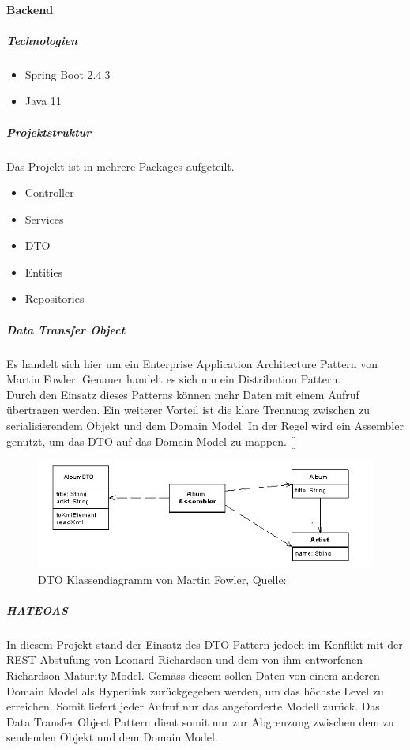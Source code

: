 \paragraph{Backend}
\subparagraph{Technologien}
\begin{itemize}
	\item Spring Boot 2.4.3
	\item Java 11
\end{itemize}
\subparagraph{Projektstruktur}
Das Projekt ist in mehrere Packages aufgeteilt. 
\begin{itemize}
	\item Controller
	\item Services
	\item DTO
	\item Entities
	\item Repositories
\end{itemize}
\subparagraph{Data Transfer Object}\label{DTO}
Es handelt sich hier um ein Enterprise Application Architecture Pattern von Martin Fowler. Genauer handelt es sich um ein Distribution Pattern. \\
Durch den Einsatz dieses Patterns können mehr Daten mit einem Aufruf übertragen werden. Ein weiterer Vorteil ist die klare Trennung zwischen zu serialisierendem Objekt und dem Domain Model. In der Regel wird ein Assembler genutzt, um das DTO auf das Domain Model zu mappen. [\cite{dtoFowler}]
\begin{figure}[H]
	\centering
	\includegraphics[width=1\textwidth]{images/dtoSketch.png}
	\caption[DTO Klassendiagramm von Martin Fowler]{DTO Klassendiagramm von Martin Fowler, Quelle: \cite{dtoFowler}}
	\label{img: dtoFowler}
\end{figure}
\subparagraph{\ac{HATEOAS}}
In diesem Projekt stand der Einsatz des DTO-Pattern jedoch im Konflikt mit der REST-Abstufung von Leonard Richardson und dem von ihm entworfenen Richardson Maturity Model. Gemäss diesem sollen Daten von einem anderen Domain Model als Hyperlink zurückgegeben werden, um das höchste Level zu erreichen. Somit liefert jeder Aufruf nur das angeforderte Modell zurück. Das Data Transfer Object Pattern dient somit nur zur Abgrenzung zwischen dem zu sendenden Objekt und dem Domain Model. 
